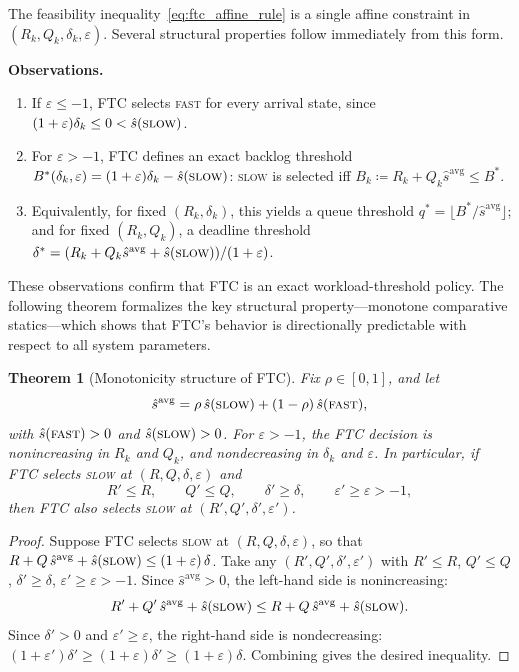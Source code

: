 \documentclass[preprint,12pt]{elsarticle}
\newtheorem{theorem}{Theorem}[section]
\begin{document}
The feasibility inequality~\eqref{eq:ftc_affine_rule} is a single affine constraint in $(R_k, Q_k, \delta_k, \varepsilon)$. Several structural properties follow immediately from this form.

\noindent\textbf{Observations.}
\begin{enumerate}
  \item[(O1)] If $\varepsilon \le -1$, FTC selects \textsc{fast} for every arrival state, since $(1+\varepsilon)\delta_k \le 0 < \hat{s}(\textsc{slow})$.
  \item[(O2)] For $\varepsilon > -1$, FTC defines an exact backlog threshold $B^{\ast}(\delta_k,\varepsilon) = (1+\varepsilon)\delta_k - \hat{s}(\textsc{slow})$: \textsc{slow} is selected iff $B_k \coloneqq R_k + Q_k \hat{s}^{\mathrm{avg}} \le B^{\ast}$.
  \item[(O3)] Equivalently, for fixed $(R_k, \delta_k)$, this yields a queue threshold $q^{\ast} = \lfloor B^{\ast}/\hat{s}^{\mathrm{avg}} \rfloor$; and for fixed $(R_k, Q_k)$, a deadline threshold $\delta^{\ast} = (R_k + Q_k \hat{s}^{\mathrm{avg}} + \hat{s}(\textsc{slow}))/(1+\varepsilon)$.
\end{enumerate}
These observations confirm that FTC is an exact workload-threshold policy. The following theorem formalizes the key structural property---monotone comparative statics---which shows that FTC's behavior is directionally predictable with respect to all system parameters.

\begin{theorem}[Monotonicity structure of FTC]
\label{thm:ftc_structure}
Fix $\rho\in[0,1]$, and let
\[
\hat{s}^{\mathrm{avg}} = \rho\,\hat{s}(\textsc{slow}) + (1-\rho)\,\hat{s}(\textsc{fast}),
\]
with $\hat{s}(\textsc{fast})>0$ and $\hat{s}(\textsc{slow})>0$. For $\varepsilon > -1$, the FTC decision is nonincreasing in $R_k$ and $Q_k$, and nondecreasing in $\delta_k$ and $\varepsilon$. In particular, if FTC selects \textsc{slow} at $(R,Q,\delta,\varepsilon)$ and
\[
R' \le R,\qquad Q' \le Q,\qquad \delta' \ge \delta,\qquad \varepsilon' \ge \varepsilon > -1,
\]
then FTC also selects \textsc{slow} at $(R',Q',\delta',\varepsilon')$.
\end{theorem}

\begin{proof}
Suppose FTC selects \textsc{slow} at $(R,Q,\delta,\varepsilon)$, so that
$R + Q\,\hat{s}^{\mathrm{avg}} + \hat{s}(\textsc{slow}) \le (1+\varepsilon)\,\delta$.
Take any $(R',Q',\delta',\varepsilon')$ with $R' \le R$, $Q' \le Q$, $\delta' \ge \delta$, $\varepsilon' \ge \varepsilon > -1$.
Since $\hat{s}^{\mathrm{avg}} > 0$, the left-hand side is nonincreasing:
\[
R' + Q'\,\hat{s}^{\mathrm{avg}} + \hat{s}(\textsc{slow}) \le R + Q\,\hat{s}^{\mathrm{avg}} + \hat{s}(\textsc{slow}).
\]
Since $\delta' > 0$ and $\varepsilon' \ge \varepsilon$, the right-hand side is nondecreasing:
$(1+\varepsilon')\delta' \ge (1+\varepsilon)\delta' \ge (1+\varepsilon)\delta$.
Combining gives the desired inequality.
\end{proof}
\end{document}
